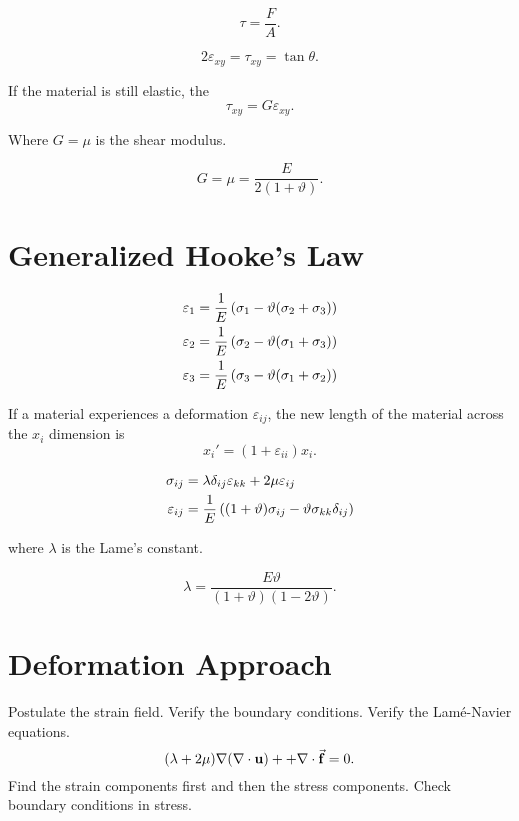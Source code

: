 \documentclass{report}
\begin{document}
\[
	\tau = \frac{F}{A}
	.\]

\[
	2\varepsilon_{xy} = \tau_{xy} = \tan\theta
	.\]

If the material is still elastic, the
\[
	\tau_{xy} = G \varepsilon_{xy}
	.\]

Where $G=\mu$ is the shear modulus.

\[
	G = \mu = \frac{E}{2(1+\vartheta)}
	.\]

\section{Generalized Hooke's Law}

\begin{align*}
	\varepsilon_1 & = \frac{1}{E}\left(\sigma_1 - \vartheta(\sigma_2 + \sigma_3)\right) \\
	\varepsilon_2 & = \frac{1}{E}\left(\sigma_2 - \vartheta(\sigma_1 + \sigma_3)\right) \\
	\varepsilon_3 & = \frac{1}{E}\left(\sigma_3 - \vartheta(\sigma_1 + \sigma_2)\right)
\end{align*}

If a material experiences a deformation $\varepsilon_{ij}$, the new length of the material across the $x_i$ dimension is
\[
	x_i' = (1+\varepsilon_{ii})x_i
	.\]

\begin{align*}
	\sigma_{ij}      & = \lambda \delta_{ij} \varepsilon_{kk} + 2\mu \varepsilon_{ij}                     \\
	\varepsilon_{ij} & = \frac{1}{E} \left((1+\vartheta)\sigma_{ij} - \vartheta \sigma_{kk}\delta_{ij} \right)
\end{align*}

where $\lambda$ is the Lame's constant.

\[
	\lambda = \frac{E\vartheta}{(1+\vartheta)(1-2\vartheta)}
	.\]

\section{Deformation Approach}

\begin{enumerate}
	\ii Postulate the strain field.
	\ii Verify the boundary conditions.
	\ii Verify the Lam\'e-Navier equations.
	\[
		(\lambda + 2\mu) \nabla(\nabla \cdot \bm{\mathrm{u}}) + + \nabla \cdot \vec{\bm{\mathrm{f}}} =  0
		.\]
	\ii Find the strain components first and then the stress components.
	\ii Check boundary conditions in stress.
\end{enumerate}
\end{document}
